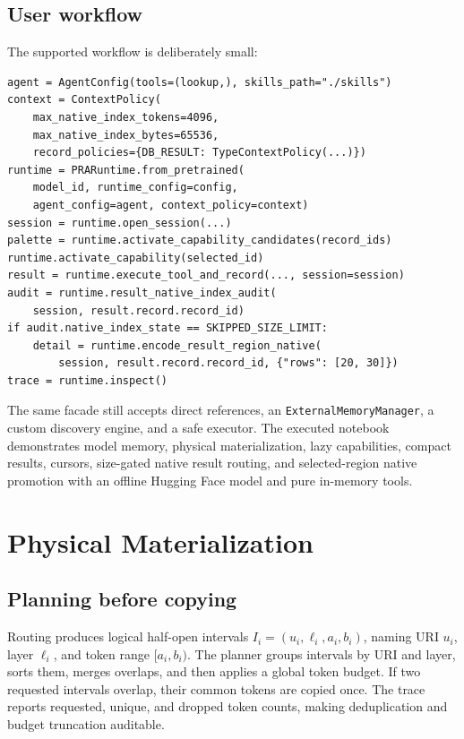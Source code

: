 \documentclass[11pt]{article}
\begin{document}
\subsection{User workflow}

The supported workflow is deliberately small:

\begin{verbatim}
agent = AgentConfig(tools=(lookup,), skills_path="./skills")
context = ContextPolicy(
    max_native_index_tokens=4096,
    max_native_index_bytes=65536,
    record_policies={DB_RESULT: TypeContextPolicy(...)})
runtime = PRARuntime.from_pretrained(
    model_id, runtime_config=config,
    agent_config=agent, context_policy=context)
session = runtime.open_session(...)
palette = runtime.activate_capability_candidates(record_ids)
runtime.activate_capability(selected_id)
result = runtime.execute_tool_and_record(..., session=session)
audit = runtime.result_native_index_audit(
    session, result.record.record_id)
if audit.native_index_state == SKIPPED_SIZE_LIMIT:
    detail = runtime.encode_result_region_native(
        session, result.record.record_id, {"rows": [20, 30]})
trace = runtime.inspect()
\end{verbatim}

The same facade still accepts direct references, an
\texttt{ExternalMemoryManager}, a custom discovery engine, and a safe executor.
The executed notebook demonstrates model memory, physical materialization,
lazy capabilities, compact results, cursors, size-gated native result routing,
and selected-region native promotion
with an offline Hugging Face model and pure in-memory tools.

\section{Physical Materialization}

\subsection{Planning before copying}

Routing produces logical half-open intervals
$I_i=(u_i,\ell_i,a_i,b_i)$, naming URI $u_i$, layer $\ell_i$, and token range
$[a_i,b_i)$.  The planner groups intervals by URI and layer, sorts them, merges
overlaps, and then applies a global token budget.  If two requested intervals
overlap, their common tokens are copied once.  The trace reports requested,
unique, and dropped token counts, making deduplication and budget truncation
auditable.
\end{document}

